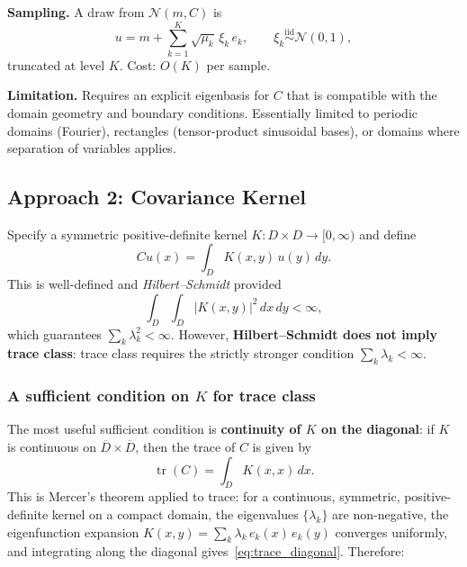 \documentclass[11pt]{article}
\DeclareMathOperator{\tr}{tr}
\begin{document}
\medskip\noindent\textbf{Sampling.}  A draw from $\mathcal{N}(m, C)$ is
\[
  u = m + \sum_{k=1}^K \sqrt{\mu_k}\, \xi_k\, e_k,
  \qquad \xi_k \overset{\text{iid}}{\sim} \mathcal{N}(0,1),
\]
truncated at level $K$.  Cost: $O(K)$ per sample.

\medskip\noindent\textbf{Limitation.} Requires an explicit eigenbasis for $C$ that is compatible with the domain geometry and boundary conditions.  Essentially limited to periodic domains (Fourier), rectangles (tensor-product sinusoidal bases), or domains where separation of variables applies.

\subsection{Approach 2: Covariance Kernel}\label{sec:kernel}

Specify a symmetric positive-definite kernel $K: D \times D \to [0,\infty)$ and define
\[
  Cu(x) = \int_D K(x,y)\, u(y)\, dy.
\]
This is well-defined and \emph{Hilbert--Schmidt} provided
\begin{equation}\label{eq:HS}
  \int_D \int_D |K(x,y)|^2\, dx\, dy < \infty,
\end{equation}
which guarantees $\sum_k \lambda_k^2 < \infty$.  However, \textbf{Hilbert--Schmidt does not imply trace class}: trace class requires the strictly stronger condition $\sum_k \lambda_k < \infty$.

\subsubsection{A sufficient condition on $K$ for trace class}\label{sec:trace_class_K}

The most useful sufficient condition is \textbf{continuity of $K$ on the diagonal}: if $K$ is continuous on $\overline{D} \times \overline{D}$, then the trace of $C$ is given by
\begin{equation}\label{eq:trace_diagonal}
  \tr(C) = \int_D K(x,x)\, dx.
\end{equation}
This is Mercer's theorem applied to trace: for a continuous, symmetric, positive-definite kernel on a compact domain, the eigenvalues $\{\lambda_k\}$ are non-negative, the eigenfunction expansion $K(x,y) = \sum_k \lambda_k \, e_k(x)\, e_k(y)$ converges uniformly, and integrating along the diagonal gives~\eqref{eq:trace_diagonal}.  Therefore:
\end{document}
